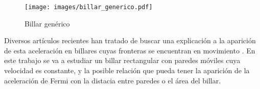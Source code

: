 \begin{figure}[H]
    \centering
    \texttt{[image: images/billar\_generico.pdf]}
    \caption{Billar genérico}
    \label{fig:bilar_generico}
\end{figure}

Diversos artículos recientes han tratado de buscar una explicación a la aparición de esta aceleración en billares cuyas fronteras se encuentran en movimiento \cite{EnergyDifussion,SuppressingFermi, SuppressingFermi2, ReferenciaProfe, NonAutonomous, ExponentialEnergy, GeneralBilliard, GeneralBilliard2}. En este trabajo se va a estudiar un billar rectangular con paredes móviles cuya velocidad es constante, y la posible relación que pueda tener la aparición de la aceleración de Fermi con la distacia entre paredes o el área del billar.

%